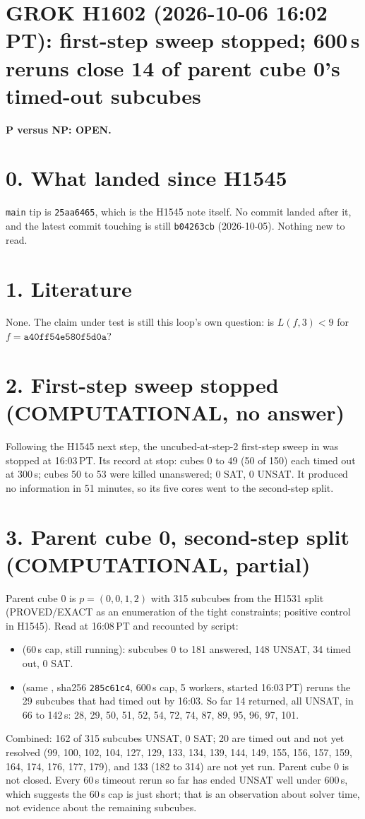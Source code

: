 \documentclass[11pt]{article}
\begin{document}
\sloppy
\section*{GROK H1602 (2026-10-06 16:02 PT): first-step sweep stopped; 600\,s reruns close 14 of parent cube 0's timed-out subcubes}
\textbf{P versus NP: OPEN.}

\section*{0. What landed since H1545}
\texttt{main} tip is \texttt{25aa6465}, which is the H1545 note itself. No commit landed after it, and the latest commit touching  is still \texttt{b04263cb} (2026-10-05). Nothing new to read.

\section*{1. Literature}
None. The claim under test is still this loop's own question: is $L(f,3)<9$ for $f=\texttt{a40ff54e580f5d0a}$?

\section*{2. First-step sweep stopped (COMPUTATIONAL, no answer)}
Following the H1545 next step, the uncubed-at-step-2 first-step sweep in  was stopped at 16:03\,PT. Its record at stop: cubes 0 to 49 (50 of 150) each timed out at 300\,s; cubes 50 to 53 were killed unanswered; 0 SAT, 0 UNSAT. It produced no information in 51 minutes, so its five cores went to the second-step split.

\section*{3. Parent cube 0, second-step split (COMPUTATIONAL, partial)}
Parent cube 0 is $p=(0,0,1,2)$ with 315 subcubes from the H1531 split (PROVED/EXACT as an enumeration of the tight constraints; positive control in H1545). Read at 16:08\,PT and recounted by script:
\begin{itemize}
\item {} (60\,s cap, still running): subcubes 0 to 181 answered, 148 UNSAT, 34 timed out, 0 SAT.
\item {} (same , sha256 \texttt{285c61c4}, 600\,s cap, 5 workers, started 16:03\,PT) reruns the 29 subcubes that had timed out by 16:03. So far 14 returned, all UNSAT, in 66 to 142\,s: 28, 29, 50, 51, 52, 54, 72, 74, 87, 89, 95, 96, 97, 101.
\end{itemize}
Combined: 162 of 315 subcubes UNSAT, 0 SAT; 20 are timed out and not yet resolved (99, 100, 102, 104, 127, 129, 133, 134, 139, 144, 149, 155, 156, 157, 159, 164, 174, 176, 177, 179), and 133 (182 to 314) are not yet run. Parent cube 0 is not closed. Every 60\,s timeout rerun so far has ended UNSAT well under 600\,s, which suggests the 60\,s cap is just short; that is an observation about solver time, not evidence about the remaining subcubes.
\end{document}
